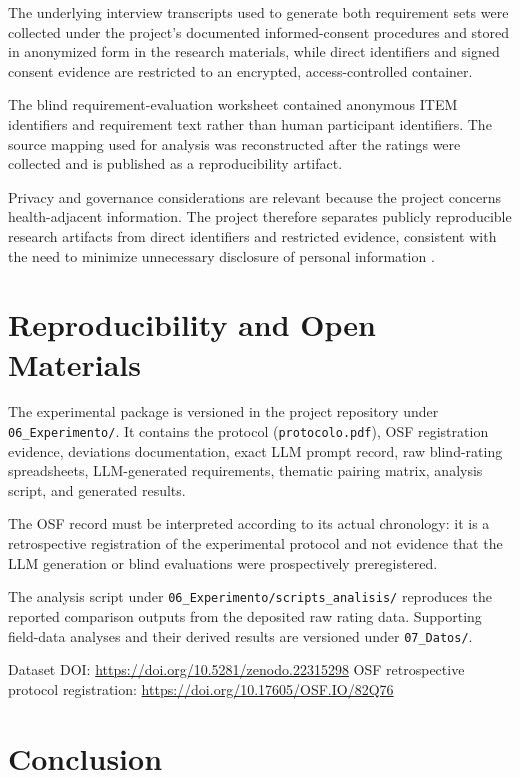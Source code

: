 \documentclass[pdflatex,sn-basic]{sn-jnl}
\begin{document}
The underlying interview transcripts used to generate both requirement sets were collected under the project's documented informed-consent procedures and stored in anonymized form in the research materials, while direct identifiers and signed consent evidence are restricted to an encrypted, access-controlled container.

The blind requirement-evaluation worksheet contained anonymous ITEM identifiers and requirement text rather than human participant identifiers. The source mapping used for analysis was reconstructed after the ratings were collected and is published as a reproducibility artifact.

Privacy and governance considerations are relevant because the project concerns health-adjacent information. The project therefore separates publicly reproducible research artifacts from direct identifiers and restricted evidence, consistent with the need to minimize unnecessary disclosure of personal information \citep{ecuador2021lopdp}.

\section{Reproducibility and Open Materials}

The experimental package is versioned in the project repository under \texttt{06\_Experimento/}. It contains the protocol (\texttt{protocolo.pdf}), OSF registration evidence, deviations documentation, exact LLM prompt record, raw blind-rating spreadsheets, LLM-generated requirements, thematic pairing matrix, analysis script, and generated results.

The OSF record must be interpreted according to its actual chronology: it is a retrospective registration of the experimental protocol and not evidence that the LLM generation or blind evaluations were prospectively preregistered.

The analysis script under \texttt{06\_Experimento/scripts\_analisis/} reproduces the reported comparison outputs from the deposited raw rating data. Supporting field-data analyses and their derived results are versioned under \texttt{07\_Datos/}.

\begin{center}
Dataset DOI: \url{https://doi.org/10.5281/zenodo.22315298}
\quad\textbar\quad
OSF retrospective protocol registration:
\url{https://doi.org/10.17605/OSF.IO/82Q76}
\end{center}

\section{Conclusion}
\end{document}

